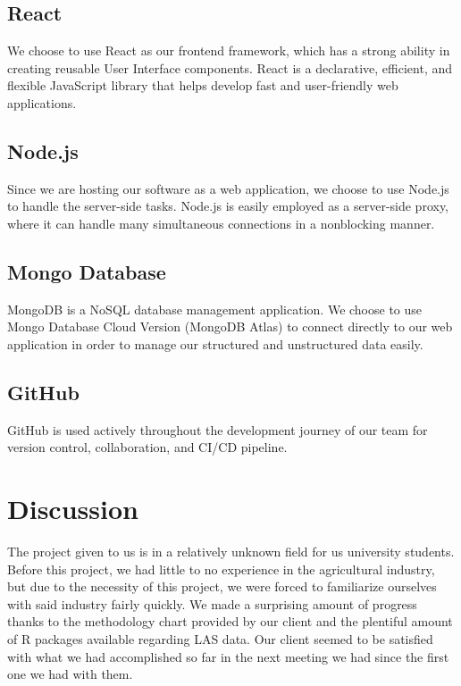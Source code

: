 \documentclass[a4paper, 12pt]{article}
\begin{document}
\subsection{React}

We choose to use React as our frontend framework, which has a strong ability in creating reusable User Interface components. React is a declarative, efficient, and flexible JavaScript library that helps develop fast and user-friendly web applications.

\subsection{Node.js}

Since we are hosting our software as a web application, we choose to use Node.js to handle the server-side tasks. Node.js is easily employed as a server-side proxy, where it can handle many simultaneous connections in a nonblocking manner.

\subsection{Mongo Database}

MongoDB is a NoSQL database management application. We choose to use Mongo Database Cloud Version (MongoDB Atlas) to connect directly to our web application in order to manage our structured and unstructured data easily.

\subsection{GitHub}

GitHub is used actively throughout the development journey of our team for version control, collaboration, and CI/CD pipeline.

\section{Discussion}

The project given to us is in a relatively unknown field for us university students. Before this project, we had little to no experience in the agricultural industry, but due to the necessity of this project, we were forced to familiarize ourselves with said industry fairly quickly. We made a surprising amount of progress thanks to the methodology chart provided by our client and the plentiful amount of R packages available regarding LAS data. Our client seemed to be satisfied with what we had accomplished so far in the next meeting we had since the first one we had with them.
\end{document}
